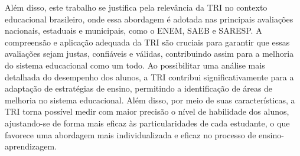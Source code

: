 Além disso, este trabalho se justifica pela relevância da TRI no contexto educacional brasileiro, onde essa abordagem é adotada nas principais avaliações nacionais, estaduais e municipais, como o ENEM, SAEB e SARESP. A compreensão e aplicação adequada da TRI são cruciais para garantir que essas avaliações sejam justas, confiáveis e válidas, contribuindo assim para a melhoria do sistema educacional como um todo.
\thispagestyle{nocontent}
Ao possibilitar uma análise mais detalhada do desempenho dos alunos, a TRI contribui significativamente para a adaptação de estratégias de ensino, permitindo a identificação de áreas de melhoria no sistema educacional. Além disso, por meio de suas características, a TRI torna possível medir com maior precisão o nível de habilidade dos alunos, ajustando-se de forma mais eficaz às particularidades de cada estudante, o que favorece uma abordagem mais individualizada e eficaz no processo de ensino-aprendizagem.



